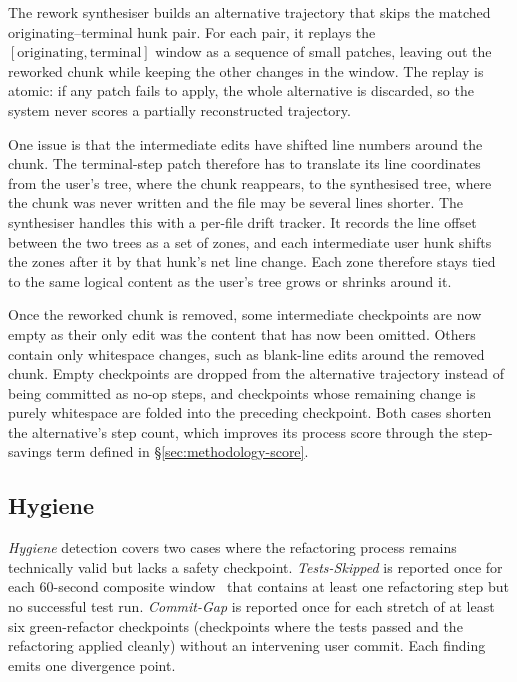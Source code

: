 The rework synthesiser builds an alternative trajectory that skips the matched originating--terminal hunk pair. For each pair, it replays the $[\mathrm{originating}, \mathrm{terminal}]$ window as a sequence of small patches, leaving out the reworked chunk while keeping the other changes in the window. The replay is atomic: if any patch fails to apply, the whole alternative is discarded, so the system never scores a partially reconstructed trajectory.

One issue is that the intermediate edits have shifted line numbers around the chunk. The terminal-step patch therefore has to translate its line coordinates from the user's tree, where the chunk reappears, to the synthesised tree, where the chunk was never written and the file may be several lines shorter. The synthesiser handles this with a per-file drift tracker. It records the line offset between the two trees as a set of zones, and each intermediate user hunk shifts the zones after it by that hunk's net line change. Each zone therefore stays tied to the same logical content as the user's tree grows or shrinks around it.

Once the reworked chunk is removed, some intermediate checkpoints are now empty as their only edit was the content that has now been omitted. Others contain only whitespace changes, such as blank-line edits around the removed chunk. Empty checkpoints are dropped from the alternative trajectory instead of being committed as no-op steps, and checkpoints whose remaining change is purely whitespace are folded into the preceding checkpoint. Both cases shorten the alternative's step count, which improves its process score through the step-savings term defined in \S\ref{sec:methodology-score}.

\subsection{Hygiene}
\label{sec:methodology-detector-hygiene}
\label{sec:methodology-hygiene}

\emph{Hygiene} detection covers two cases where the refactoring process remains technically valid but lacks a safety checkpoint. \emph{Tests-Skipped} is reported once for each 60-second composite window~\cite{murphyhill2009howrefactor} that contains at least one refactoring step but no successful test run. \emph{Commit-Gap} is reported once for each stretch of at least six green-refactor checkpoints (checkpoints where the tests passed and the refactoring applied cleanly) without an intervening user commit. Each finding emits one divergence point.

